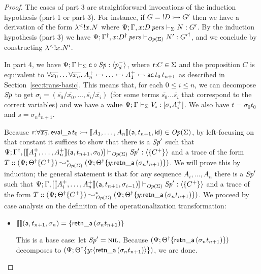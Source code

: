 \begin{proof}
The cases of part 3 are straightforward invocations of the induction
hypothesis (part 1 or part 3). For instance, if $G = {!}D \rightarrowtail G'$
then we have a derivation of the form ${\lambda}^{<}{{!}{x}.{N}}$
where ${\Psi}; {\Gamma, x{:}{D}\,{{\it pers}}} \vdash_{\Sigma} {N} : {G'}$. By the
induction hypothesis (part 3) we have
${\Psi}; {{{{\Gamma}^\dag}},{x{:}{{{D}^\dag}}\,{{\it pers}}}} \vdash_{{\it Op}({\Sigma})} {N'} : {{{G'}^\dag}}$, and we conclude by
constructing ${\lambda}^{<}{{!}{x}.{N'}}$.

In part 4, we have ${\Psi}; {\Gamma} \vdash_{\Sigma} {{\sf
    c} \circ {{\it Sp}}} : {\langle {p^-_d} \rangle}$, where ${\sf r}{:}C \in \Sigma$ and the
proposition $C$ is equivalent to
$\forall{\overline{x_0}}\ldots\forall{\overline{x_n}}.\, A^+_n \rightarrowtail
\ldots \rightarrowtail A^+_1 \rightarrowtail {\sf ac}\,t_0\,t_{n+1}$ as described in
Section~\ref{sec:trans-basic}. This means that, for each $0 \leq
i \leq n$, we can decompose ${\it Sp}$ to
get $\sigma_i = (\overline{s_0}/\overline{x_0},\ldots,
\overline{s_i}/\overline{x_i})$ (for some terms $\overline{s_0} \ldots
\overline{s_i}$ that correspond to the correct variables) and 
we have a value
${\Psi}; {\Gamma} \vdash_{\Sigma} {V_i} : {[\sigma_i{A^+_i}]}$. 
We also have $t = \sigma_0{t_0}$ and $s = \sigma_n{t_{n+1}}$.

Because 
${\sf r}{:}\forall\overline{x_0}.\,{\sf eval\_a}\,t_0 \rightarrowtail \llbracket {A_1, \ldots, A_n} \rrbracket({\sf a},{t_{n+1}},{{\sf id}}) \in {\it Op}({\Sigma})$, by left-focusing
on that constant
it suffices to show that
there is a ${\it Sp}'$ such that 
${\Psi}; {{{\Gamma}^\dag},[
\llbracket {A_1^+, \ldots, A_n^+} \rrbracket({\sf a},{t_{n+1}},{\sigma_0})
]} \vdash_{{\it Op}({\Sigma})} {{\it Sp}'} : {\langle {\{C^+\}} \rangle}$ and a trace of the form
$T :: (\Psi; {{{\Theta}^\dag}}\{{C^+}\}) \leadsto^*_{{\it Op}({\Sigma})}
 (\Psi; {{{\Theta}^\dag}}\{{y{:}{\sf retn\_a}\,({\sigma_n}t_{n+1})}\})$. 
We will prove this
by induction; the general statement is that for any sequence $A_i,\ldots,A_n$ 
there is a ${\it Sp}'$ such that 
${\Psi}; {\Gamma,[
\llbracket {A_i^+, \ldots, A_n^+} \rrbracket({\sf a},{t_{n+1}},{\sigma_{i-1}})
]} \vdash_{{\it Op}({\Sigma})} {{\it Sp}'} : {\langle {\{C^+\}} \rangle}$ and a trace of the form
$T :: (\Psi; {{{\Theta}^\dag}}\{{C^+}\}) \leadsto^*_{{\it Op}({\Sigma})}
 (\Psi; {{{\Theta}^\dag}}\{{y{:}{\sf retn\_a}\,({\sigma_n}t_{n+1})}\})$. We proceed
by case analysis on the definition of the operationalization transformation:
\begin{itemize}
\item $\llbracket {} \rrbracket({\sf a},{t_{n+1}},{\sigma_n}) = \{ {\sf retn\_a}\,(\sigma_{n}{t_{n+1}}) \}$

  \bigskip
  This is a base case: 
  let ${\it Sp}' = \textsc{nil}$. Because 
  $(\Psi; {{{\Theta}^\dag}}\{{{\sf retn\_a}\,(\sigma_{n}{t_{n+1}})}\})$ decomposes
  to $(\Psi; 
  {{{\Theta}^\dag}}\{{y{:}{\langle {{\sf retn\_a}\,(\sigma_{n}{t_{n+1}})} \rangle}}\})$,
  we are done.
  \bigskip


\end{itemize}
\end{proof}
